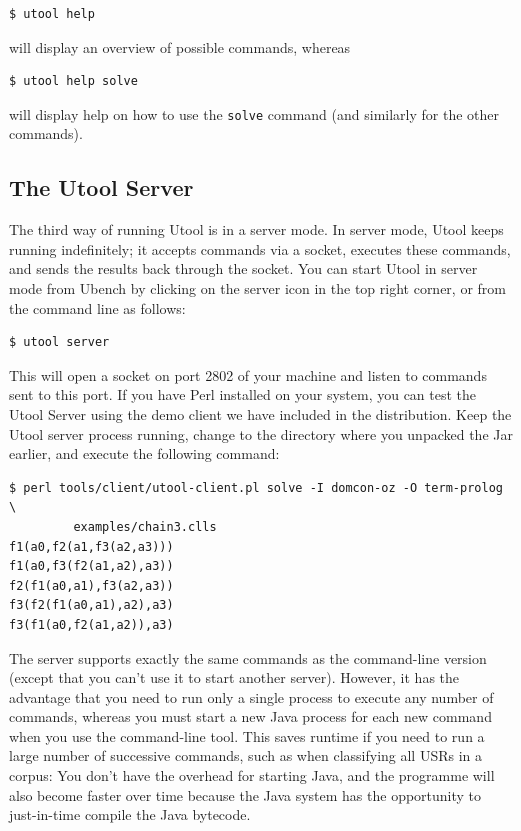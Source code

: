\begin{verbatim}
$ utool help
\end{verbatim}

will display an overview of possible commands, whereas

\begin{verbatim}
$ utool help solve
\end{verbatim}

will display help on how to use the \verb?solve? command (and similarly for the other commands).




\subsection{The Utool Server} 

The third way of running Utool is in a server mode. In server mode, Utool
keeps running indefinitely; it accepts commands via a socket, executes
these commands, and sends the results back through the socket. You can
start Utool in server mode from Ubench by clicking on the server icon in the top right corner, or from the command line as follows:

\begin{verbatim}
$ utool server
\end{verbatim}

This will open a socket on port 2802 of your machine and listen to
commands sent to this port. If you have Perl installed on your
system, you can test the Utool Server using the demo client we have
included in the distribution. Keep the Utool server process
running, change to the directory where you unpacked the Jar earlier, and execute the following command:

\begin{verbatim}
$ perl tools/client/utool-client.pl solve -I domcon-oz -O term-prolog \
         examples/chain3.clls
f1(a0,f2(a1,f3(a2,a3)))
f1(a0,f3(f2(a1,a2),a3))
f2(f1(a0,a1),f3(a2,a3))
f3(f2(f1(a0,a1),a2),a3)
f3(f1(a0,f2(a1,a2)),a3)
\end{verbatim}

The server supports exactly the same commands as the command-line
version (except that you can't use it to start another
server). However, it has the advantage that you need to run only a
single process to execute any number of commands, whereas you must
start a new Java process for each new command when you use the
command-line tool. This saves runtime if you need to run a large
number of successive commands, such as when classifying all USRs in a
corpus: You don't have the overhead for starting Java, and the
programme will also become faster over time because the Java system
has the opportunity to just-in-time compile the Java bytecode.




